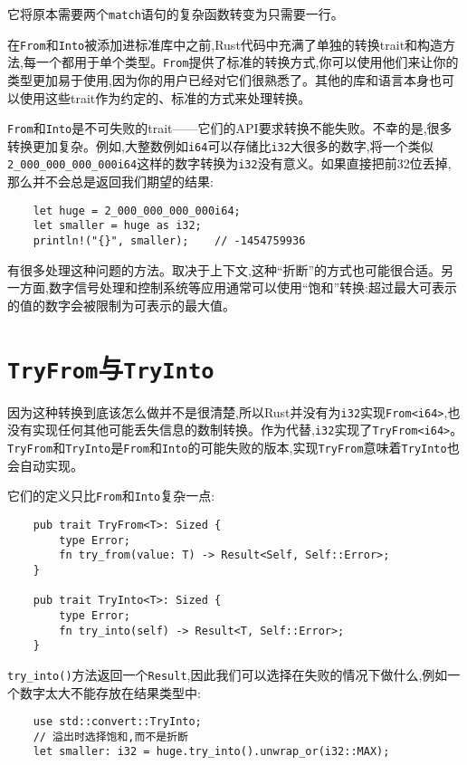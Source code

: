 它将原本需要两个\texttt{match}语句的复杂函数转变为只需要一行。

在\texttt{From}和\texttt{Into}被添加进标准库中之前,Rust代码中充满了单独的转换trait和构造方法,每一个都用于单个类型。\texttt{From}提供了标准的转换方式,你可以使用他们来让你的类型更加易于使用,因为你的用户已经对它们很熟悉了。其他的库和语言本身也可以使用这些trait作为约定的、标准的方式来处理转换。

\texttt{From}和\texttt{Into}是不可失败的trait——它们的API要求转换不能失败。不幸的是,很多转换更加复杂。例如,大整数例如\texttt{i64}可以存储比\texttt{i32}大很多的数字,将一个类似\texttt{2\_000\_000\_000\_000i64}这样的数字转换为\texttt{i32}没有意义。如果直接把前32位丢掉,那么并不会总是返回我们期望的结果:
\begin{verbatim}
    let huge = 2_000_000_000_000i64;
    let smaller = huge as i32;
    println!("{}", smaller);    // -1454759936
\end{verbatim}

有很多处理这种问题的方法。取决于上下文,这种“折断”的方式也可能很合适。另一方面,数字信号处理和控制系统等应用通常可以使用“饱和”转换:超过最大可表示的值的数字会被限制为可表示的最大值。

\section{\texttt{TryFrom}与\texttt{TryInto}}\label{tryfrom}

因为这种转换到底该怎么做并不是很清楚,所以Rust并没有为\texttt{i32}实现\texttt{From<i64>},也没有实现任何其他可能丢失信息的数制转换。作为代替,\texttt{i32}实现了\texttt{TryFrom<i64>}。\texttt{TryFrom}和\texttt{TryInto}是\texttt{From}和\texttt{Into}的可能失败的版本,实现\texttt{TryFrom}意味着\texttt{TryInto}也会自动实现。

它们的定义只比\texttt{From}和\texttt{Into}复杂一点:
\begin{verbatim}
    pub trait TryFrom<T>: Sized {
        type Error;
        fn try_from(value: T) -> Result<Self, Self::Error>;
    }

    pub trait TryInto<T>: Sized {
        type Error;
        fn try_into(self) -> Result<T, Self::Error>;
    }
\end{verbatim}

\texttt{try\_into()}方法返回一个\texttt{Result},因此我们可以选择在失败的情况下做什么,例如一个数字太大不能存放在结果类型中:
\begin{verbatim}
    use std::convert::TryInto;
    // 溢出时选择饱和,而不是折断
    let smaller: i32 = huge.try_into().unwrap_or(i32::MAX);
\end{verbatim}


